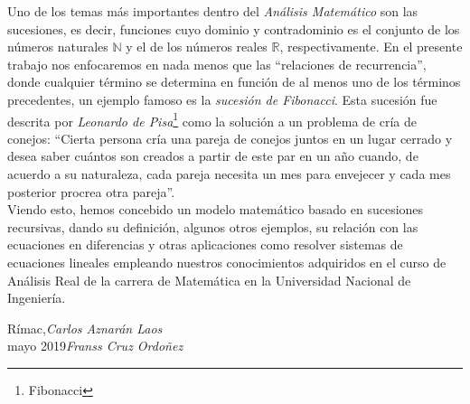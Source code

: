 \preface
Uno de los temas más importantes dentro del \emph{Análisis Matemático} son las sucesiones, es decir, funciones cuyo dominio y contradominio es el conjunto de los números naturales $\mathds{N}$ y el de los números reales $\mathds{R}$, respectivamente. En el presente trabajo nos enfocaremos en nada menos que las ``relaciones de recurrencia'', donde cualquier  término se determina en función de al menos uno de los términos precedentes, un ejemplo famoso es la \emph{sucesión de Fibonacci}. Esta sucesión fue descrita por \emph{Leonardo de Pisa}\footnote{Fibonacci} como la solución a un problema de cría de conejos:
``Cierta persona cría una pareja de conejos juntos en un lugar cerrado y desea saber cuántos son creados a partir de este par en un año cuando, de acuerdo a su naturaleza, cada pareja necesita un mes para envejecer y cada mes posterior procrea otra pareja''.\\[\baselineskip]

Viendo esto, hemos concebido un modelo matemático basado en sucesiones recursivas, dando su definición, algunos otros ejemplos, su relación con las ecuaciones en diferencias y otras aplicaciones como resolver sistemas de ecuaciones lineales empleando nuestros conocimientos adquiridos en el curso de Análisis Real de la carrera de Matemática en la Universidad
Nacional de Ingeniería.
\vspace{\baselineskip}
\begin{flushright}\noindent
Rímac,\hfill {\it Carlos Aznarán Laos}\\
mayo 2019\hfill {\it Franss Cruz Ordoñez}\\
\end{flushright}